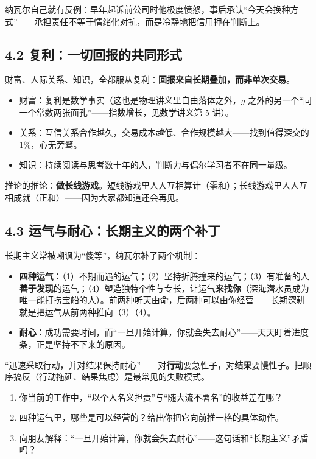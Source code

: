 \documentclass[UTF8,a4paper,11pt]{ctexart}
\begin{document}
纳瓦尔自己就有反例：早年起诉前公司时他极度愤怒，事后承认“今天会换种方式”——承担责任不等于情绪化对抗，而是冷静地把信用押在判断上。

\subsection*{4.2 复利：一切回报的共同形式}

财富、人际关系、知识，全都服从复利：\textbf{回报来自长期叠加，而非单次交易}。

\begin{itemize}
  \item 财富：复利是数学事实（这也是物理讲义里自由落体之外，$g$ 之外的另一个“同一个常数两张面孔”——指数增长，见数学讲义第 5 讲）。
  \item 关系：互信关系合作越久，交易成本越低、合作规模越大——找到值得深交的 1\%，心无旁骛。
  \item 知识：持续阅读与思考数十年的人，判断力与偶尔学习者不在同一量级。
\end{itemize}

推论的推论：\textbf{做长线游戏}。短线游戏里人人互相算计（零和）；长线游戏里人人互相成就（正和）——因为大家都知道还会再见。

\subsection*{4.3 运气与耐心：长期主义的两个补丁}

长期主义常被嘲讽为“傻等”，纳瓦尔补了两个机制：

\begin{itemize}
  \item \textbf{四种运气}：（1）不期而遇的运气；（2）坚持折腾撞来的运气；（3）有准备的人\textbf{善于发现}的运气；（4）塑造独特个性与专长，让运气\textbf{来找你}（深海潜水员成为唯一能打捞宝船的人）。前两种听天由命，后两种可以由你经营——长期深耕就是把运气从前两种推向（3）（4）。
  \item \textbf{耐心}：成功需要时间，而“一旦开始计算，你就会失去耐心”——天天盯着进度条，正是坚持不下来的原因。
\end{itemize}

\begin{keyconcept}
“迅速采取行动，并对结果保持耐心”——对\textbf{行动}要急性子，对\textbf{结果}要慢性子。把顺序搞反（行动拖延、结果焦虑）是最常见的失败模式。
\end{keyconcept}

\begin{exercise}[今日自测]
\begin{enumerate}
  \item 你当前的工作中，“以个人名义担责”与“随大流不署名”的收益差在哪？
  \item 四种运气里，哪些是可以经营的？给出你把它向前推一格的具体动作。
  \item 向朋友解释：“一旦开始计算，你就会失去耐心”——这句话和“长期主义”矛盾吗？
\end{enumerate}
\end{exercise}
\end{document}
